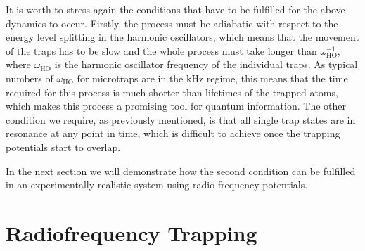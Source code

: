 It is worth to stress again the conditions that have to be fulfilled
for the above dynamics to occur. Firstly, the process must be
adiabatic with respect to the energy level splitting in the harmonic
oscillators, which means that the movement of the traps has to be slow
and the whole process must take longer than $\omega^{-1}_\text{HO}$,
where $\omega_\text{HO}$ is the harmonic oscillator frequency of the
individual traps. As typical numbers of $\omega_\text{HO}$ for
microtraps are in the kHz regime, this means that the time required
for this process is much shorter than lifetimes of the trapped atoms,
which makes this process a promising tool for quantum information. The
other condition we require, as previously mentioned, is that all
single trap states are in resonance at any point in time, which is
difficult to achieve once the trapping potentials start to overlap.

In the next section we will demonstrate how the second condition can
be fulfilled in an experimentally realistic system using radio
frequency potentials.



\section{\label{sec:RFTraps} Radiofrequency Trapping}


